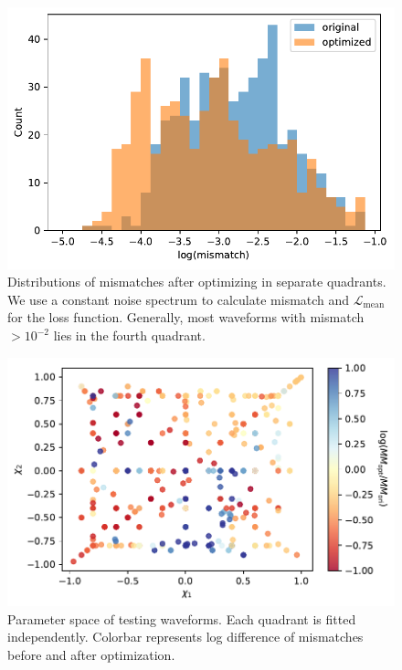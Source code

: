 \documentclass[twocolumn]{aastex631}
\begin{document}
\begin{figure}[t]
	\centering
	\includegraphics[width=\columnwidth]{../static/all_quadrants.pdf}
	\caption{Distributions of mismatches after optimizing in separate quadrants. We use a constant noise spectrum to calculate mismatch and $\mathcal{L}_{\mathrm{mean}}$ for the loss function. Generally, most waveforms with mismatch $>10^{-2}$ lies in the fourth quadrant. }
	\label{fig:all_quadrants}
\end{figure}

\begin{figure}[t]
	\centering
	\includegraphics[width=\columnwidth]{../static/ps_q148_quadrant.pdf}
	\caption{Parameter space of testing waveforms. Each quadrant is fitted independently. Colorbar represents log difference of mismatches before and after optimization.}
	\label{fig:ps_q148_quadrant}
\end{figure}
\end{document}
